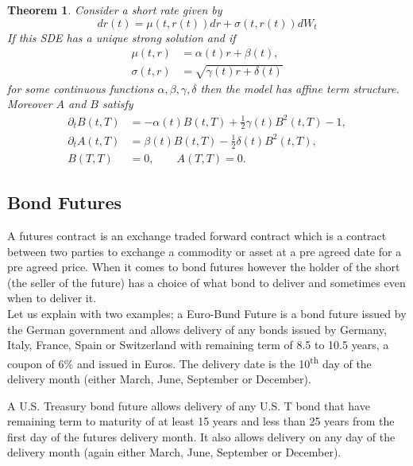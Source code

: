 \documentclass[12pt&a4paper]{article}
\newtheorem{theorem}{Theorem}[section]
\numberwithin{equation}{section}
\begin{document}
\begin{theorem}
	Consider a short rate given by
	\begin{equation}
	dr(t)=\mu(t,r(t))dr + \sigma(t,r(t))dW_t
	\end{equation}
	If this SDE has a unique strong solution and if
	\begin{equation}
	\begin{aligned}
	\mu(t,r)&=\alpha(t)r+\beta(t),\\
	\sigma(t,r)&=\sqrt{\gamma(t)r+\delta(t)}
	\end{aligned}
	\end{equation}
	for some continuous functions $\alpha,\beta,\gamma,\delta$ then the model has affine term structure. Moreover $A$ and $B$ satisfy
	\begin{equation}
	\begin{aligned}
	\partial_t B(t,T)&= -\alpha(t)B(t,T)+\frac{1}{2}\gamma(t)B^2(t,T)-1,\\
	\partial_t A(t,T)&= \beta(t)B(t,T)-\frac{1}{2}\delta(t)B^2(t,T),\\
	B(T,T)&=0,\qquad A(T,T)=0.
	\end{aligned}
	\end{equation}
\end{theorem}


\subsection{Bond Futures}
A futures contract is an exchange traded forward contract which is a contract between two parties to exchange a commodity or asset at a pre agreed date for a pre agreed price. When it comes to bond futures however the holder of the short (the seller of the future) has a choice of what bond to deliver and sometimes even when to deliver it.\\

Let us explain with two examples; a Euro-Bund Future is a bond future issued by the German government and allows delivery of any bonds issued by Germany, Italy, France, Spain or Switzerland with remaining term of 8.5 to 10.5 years, a coupon of 6\% and issued in Euros. The delivery date is the 10\textsuperscript{th} day of the delivery month (either March, June, September or December).

A U.S. Treasury bond future allows delivery of any U.S. T bond that have remaining term to maturity of at least 15 years and less than 25 years from the first day of the futures delivery month. It also allows delivery on any day of the delivery month (again either March, June, September or December).
\end{document}
